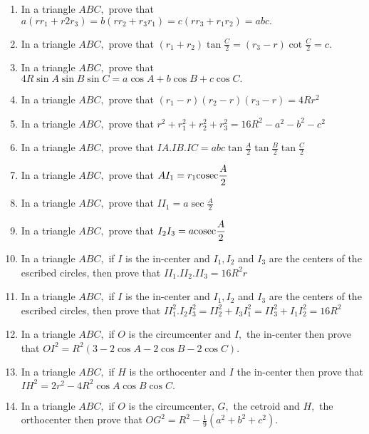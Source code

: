 \begin{enumerate}
\item In a triangle $ABC,$ prove that $a(rr_1 + r2r_3) = b(rr_2 + r_3r_1) = c(rr_3 + r_1r_2) = abc.$

\item In a triangle $ABC,$ prove that $(r_1 + r_2)\tan\frac{C}{2} = (r_3 - r)\cot\frac{C}{2} = c.$

\item In a triangle $ABC,$ prove that $4R\sin A\sin B\sin C = a\cos A + b\cos B + c\cos C.$

\item In a triangle $ABC,$ prove that $(r_1 - r)(r_2 - r)(r_3 - r) = 4Rr^2$

\item In a triangle $ABC,$ prove that $r^2 + r_1^2 + r_2^2 + r_3^2 = 16R^2 - a^2 - b^2 - c^2$

\item In a triangle $ABC,$ prove that $IA. IB. IC = abc\tan\frac{A}{2}\tan\frac{B}{2}\tan\frac{C}{2}$

\item In a triangle $ABC,$ prove that $AI_1 = r_1{\rm cosec}\frac{A}{2}$

\item In a triangle $ABC,$ prove that $II_1 = a\sec\frac{A}{2}$

\item In a triangle $ABC,$ prove that $I_2I_3 = a{\rm cosec}\frac{A}{2}$

\item In a triangle $ABC,$ if $I$ is the in-center and $I_1, I_2$ and $I_3$ are the centers of the escribed
   circles, then prove that $II_1.II_2.II_3 = 16R^2r$

\item In a triangle $ABC,$ if $I$ is the in-center and $I_1, I_2$ and $I_3$ are the centers of the escribed
   circles, then prove that $II_1^2.I_2I_3^2 = II_2^2 + I_3I_1^2 = II_3^2 + I_1I_2^2 = 16R^2$

\item In a triangle $ABC,$ if $O$ is the circumcenter and $I,$ the in-center then prove that $OI^2 = R^2(3 -
   2\cos A - 2\cos B - 2\cos C).$

\item In a triangle $ABC,$ if $H$ is the orthocenter and $I$ the in-center then prove that $IH^2 = 2r^2 -
   4R^2\cos A\cos B\cos C.$

\item In a triangle $ABC,$ if $O$ is the circumcenter, $G,$ the cetroid and $H,$ the orthocenter then prove
   that $OG^2 = R^2 - \frac{1}{9}(a^2 + b^2 + c^2).$


\end{enumerate}
